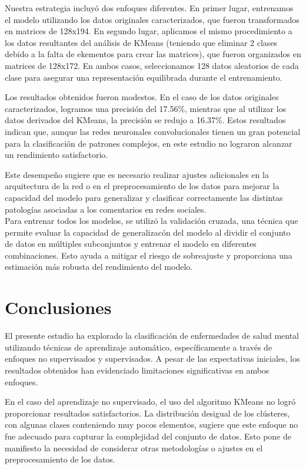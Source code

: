\documentclass[
10pt, %
a4paper, %
oneside, %
headinclude,footinclude, %
BCOR5mm, %
]{scrartcl}
\begin{document}
Nuestra estrategia incluyó dos enfoques diferentes. En primer lugar, entrenamos el modelo utilizando los datos originales caracterizados, que fueron transformados en matrices de 128x194. 
En segundo lugar, aplicamos el mismo procedimiento a los datos resultantes del análisis de KMeans (teniendo que eliminar 2 clases debido a la falta de ekementos para crear las matrices), 
que fueron organizados en matrices de 128x172. En ambos casos, seleccionamos 128 datos aleatorios de cada clase para asegurar una representación equilibrada durante el entrenamiento.

Los resultados obtenidos fueron modestos. En el caso de los datos originales caracterizados, logramos una precisión del 17.56\%, mientras que al utilizar los datos derivados del KMeans, 
la precisión se redujo a 16.37\%. Estos resultados indican que, aunque las redes neuronales convolucionales tienen un gran potencial para la clasificación de patrones complejos, en este estudio 
no lograron alcanzar un rendimiento satisfactorio. 

Este desempeño sugiere que es necesario realizar ajustes adicionales en la arquitectura de la red o en el preprocesamiento de los datos para mejorar la capacidad del modelo para generalizar y clasificar 
correctamente las distintas patologías asociadas a los comentarios en redes sociales.\\



Para entrenar todos los modelos, se utilizó la validación cruzada, una técnica que permite evaluar la capacidad de generalizacón del modelo al dividir el conjunto de datos en múltiples subconjuntos y entrenar el modelo 
en diferentes combinaciones. Esto ayuda a mitigar el riesgo de sobreajuste y proporciona una estimación más robusta del rendimiento del modelo.

\section{Conclusiones}

El presente estudio ha explorado la clasificación de enfermedades de salud mental utilizando técnicas de aprendizaje automático, específicamente a través de enfoques no supervisados y supervisados. 
A pesar de las expectativas iniciales, los resultados obtenidos han evidenciado limitaciones significativas en ambos enfoques.

En el caso del aprendizaje no supervisado, el uso del algoritmo KMeans no logró proporcionar resultados satisfactorios. La distribución desigual de los clústeres, con algunas 
clases conteniendo muy pocos elementos, sugiere que este enfoque no fue adecuado para capturar la complejidad del conjunto de datos. Esto pone de manifiesto la necesidad de considerar otras 
metodologías o ajustes en el preprocesamiento de los datos.
\end{document}

